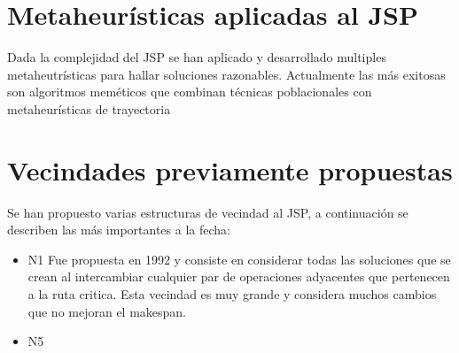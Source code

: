 \section{Metaheurísticas aplicadas al JSP}
Dada la complejidad del JSP se han aplicado y desarrollado multiples metaheutrísticas para hallar soluciones razonables. Actualmente las más exitosas son algoritmos meméticos que combinan técnicas poblacionales con metaheurísticas de trayectoria

\section{Vecindades previamente propuestas}
Se han propuesto varias estructuras de vecindad al JSP, a continuación se describen las más importantes a la fecha:

\begin{itemize}
\item N1  Fue propuesta en 1992 \cite{blazewicz1996job} y consiste en considerar todas las soluciones que se crean al intercambiar cualquier par de operaciones adyacentes que pertenecen a la ruta critica. Esta vecindad es muy grande y considera muchos cambios que no mejoran el makespan.
\item N5 
\end{itemize}